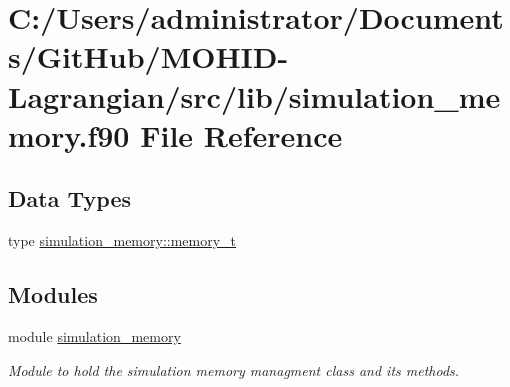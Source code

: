 \hypertarget{simulation__memory_8f90}{}\section{C\+:/\+Users/administrator/\+Documents/\+Git\+Hub/\+M\+O\+H\+I\+D-\/\+Lagrangian/src/lib/simulation\+\_\+memory.f90 File Reference}
\label{simulation__memory_8f90}
\subsection*{Data Types}
\begin{DoxyCompactItemize}
\item 
type \hyperlink{structsimulation__memory_1_1memory__t}{simulation\+\_\+memory\+::memory\+\_\+t}
\end{DoxyCompactItemize}
\subsection*{Modules}
\begin{DoxyCompactItemize}
\item 
module \hyperlink{namespacesimulation__memory}{simulation\+\_\+memory}
\begin{DoxyCompactList}\small\item\em Module to hold the simulation memory managment class and its methods. \end{DoxyCompactList}\end{DoxyCompactItemize}
